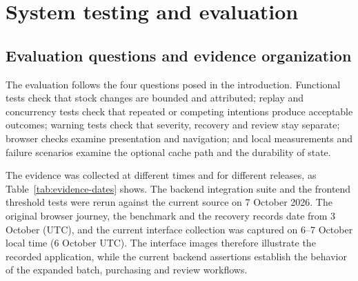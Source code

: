 \chapter{System testing and evaluation}

\FloatBarrier

\section{Evaluation questions and evidence organization}

The evaluation follows the four questions posed in the introduction. Functional tests check that stock changes are bounded and attributed; replay and concurrency tests check that repeated or competing intentions produce acceptable outcomes; warning tests check that severity, recovery and review stay separate; browser checks examine presentation and navigation; and local measurements and failure scenarios examine the optional cache path and the durability of state.


The evidence was collected at different times and for different releases, as Table~\ref{tab:evidence-dates} shows. The backend integration suite and the frontend threshold tests were rerun against the current source on 7 October 2026. The original browser journey, the benchmark and the recovery records date from 3 October (UTC), and the current interface collection was captured on 6–7 October local time (6 October UTC). The interface images therefore illustrate the recorded application, while the current backend assertions establish the behavior of the expanded batch, purchasing and review workflows.


